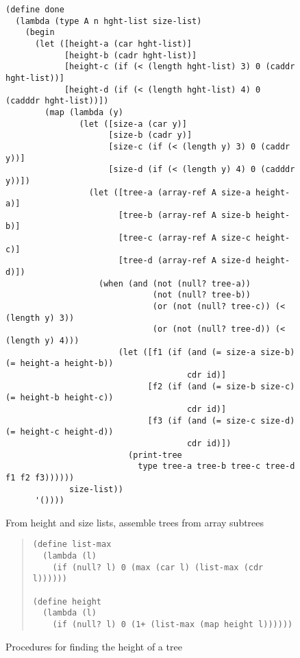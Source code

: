 \begin{figure}
\begin{frameit}
\begin{verbatim}
(define done
  (lambda (type A n hght-list size-list)
    (begin
      (let ([height-a (car hght-list)]
            [height-b (cadr hght-list)]
            [height-c (if (< (length hght-list) 3) 0 (caddr hght-list))]
            [height-d (if (< (length hght-list) 4) 0 (cadddr hght-list))])
        (map (lambda (y)
               (let ([size-a (car y)]
                     [size-b (cadr y)]
                     [size-c (if (< (length y) 3) 0 (caddr y))]
                     [size-d (if (< (length y) 4) 0 (cadddr y))])
                 (let ([tree-a (array-ref A size-a height-a)]
                       [tree-b (array-ref A size-b height-b)]
                       [tree-c (array-ref A size-c height-c)]
                       [tree-d (array-ref A size-d height-d)])
                   (when (and (not (null? tree-a))
                              (not (null? tree-b))
                              (or (not (null? tree-c)) (< (length y) 3))
                              (or (not (null? tree-d)) (< (length y) 4)))
                       (let ([f1 (if (and (= size-a size-b) (= height-a height-b))
                                     cdr id)]
                             [f2 (if (and (= size-b size-c) (= height-b height-c))
                                     cdr id)]
                             [f3 (if (and (= size-c size-d) (= height-c height-d))
                                     cdr id)])
                         (print-tree
                           type tree-a tree-b tree-c tree-d f1 f2 f3))))))
             size-list))
      '())))
\end{verbatim}
\caption{From height and size lists, assemble trees from array subtrees}
\label{fig:done}
\end{frameit}
\end{figure}

\begin{figure}
\begin{frameit}
\begin{quote}
\begin{verbatim}
(define list-max
  (lambda (l)
    (if (null? l) 0 (max (car l) (list-max (cdr l))))))

(define height
  (lambda (l)
    (if (null? l) 0 (1+ (list-max (map height l))))))
\end{verbatim}
\end{quote}
\caption{Procedures for finding the height of a tree}
\label{fig:tree-height}
\end{frameit}
\end{figure}

